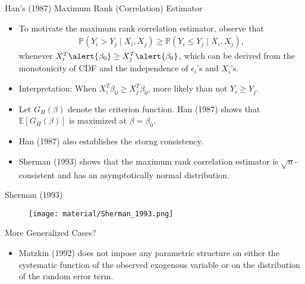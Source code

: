 \documentclass[xcolor=svgnames,dvipdfmx,cjk]{beamer}
\theoremstyle{example}
\def\E{\mathbb{E}}
\def\P{\mathbb{P}}
\begin{document}
\begin{frame}{Han's (1987) Maximum Rank (Correlation) Estimator}
\begin{itemize}
    \item To motivate the maximum rank correlation estimator, observe that
          \begin{align*}
            \P(Y_i > Y_j \mid X_i, X_j) \geq \P(Y_i \leq Y_j \mid X_i, X_j),
          \end{align*}
          whenever $X_i^T\alert{\beta_0} \geq X_j^T\alert{\beta_0}$,
          which can be derived from the monotonicity of CDF 
          and the independence of $\epsilon_i$'s and $X_i$'s.
    \item \alert{Interpretation}: 
          When $X_i^T\beta_0 \geq X_j^T\beta_0$, more likely than not $Y_i \geq Y_j$.
    \item Let $G_H(\beta)$ denote the criterion function. 
          Han (1987) shows that $\E[G_H(\beta)]$ is maximized at $\beta = \beta_0$.
    \item Han (1987) also establishes the storng consistency.
    \item Sherman (1993) shows that 
          the maximum rank correlation estimator is $\sqrt{n}$-consistent
          and has an asymptotically normal distribution.
\end{itemize}
\end{frame}  

\begin{frame}{Sherman (1993)}
  \begin{figure}
    \begin{center}
      \texttt{[image: material/Sherman\_1993.png]}
    \end{center}
  \end{figure}
\end{frame}

\begin{frame}{More Generalized Cases?}
\begin{itemize}
  \item Matzkin (1992) does not impose any parametric structure on 
        either the systematic function of the observed exogenous variable
        or on the distribution of the random error term.
\end{itemize}
\end{frame}

  
\end{document}
